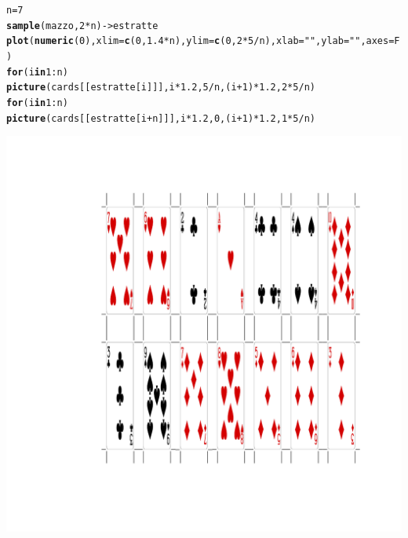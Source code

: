 \documentclass[onecolumn,12pt]{book}\usepackage[]{graphicx}\usepackage[]{color}
\makeatletter
\def\maxwidth{ %
  \ifdim\Gin@nat@width>\linewidth
    \linewidth
  \else
    \Gin@nat@width
  \fi
}
\newcommand{\hlnum}[1]{\textcolor[rgb]{0.686,0.059,0.569}{#1}}%
\newcommand{\hlstr}[1]{\textcolor[rgb]{0.192,0.494,0.8}{#1}}%
\newcommand{\hlopt}[1]{\textcolor[rgb]{0,0,0}{#1}}%
\newcommand{\hlstd}[1]{\textcolor[rgb]{0.345,0.345,0.345}{#1}}%
\newcommand{\hlkwa}[1]{\textcolor[rgb]{0.161,0.373,0.58}{\textbf{#1}}}%
\newcommand{\hlkwb}[1]{\textcolor[rgb]{0.69,0.353,0.396}{#1}}%
\newcommand{\hlkwc}[1]{\textcolor[rgb]{0.333,0.667,0.333}{#1}}%
\newcommand{\hlkwd}[1]{\textcolor[rgb]{0.737,0.353,0.396}{\textbf{#1}}}%
\newenvironment{kframe}{%
 \def\at@end@of@kframe{}%
 \ifinner\ifhmode%
  \def\at@end@of@kframe{\end{minipage}}%
  \begin{minipage}{\columnwidth}%
 \fi\fi%
 \def\FrameCommand##1{\hskip\@totalleftmargin \hskip-\fboxsep
 \colorbox{shadecolor}{##1}\hskip-\fboxsep
     \hskip-\linewidth \hskip-\@totalleftmargin \hskip\columnwidth}%
 \MakeFramed {\advance\hsize-\width
   \@totalleftmargin\z@ \linewidth\hsize
   \@setminipage}}%
 {\par\unskip\endMakeFramed%
 \at@end@of@kframe}
\newenvironment{knitrout}{}{} %
\makeatother
\begin{document}
\begin{knitrout}
\color{fgcolor}\begin{kframe}
\begin{alltt}
\hlstd{n}\hlkwb{=}\hlnum{7}
\hlkwd{sample}\hlstd{(mazzo,}\hlnum{2}\hlopt{*}\hlstd{n)}\hlkwb{->}\hlstd{estratte}
\hlkwd{plot}\hlstd{(}\hlkwd{numeric}\hlstd{(}\hlnum{0}\hlstd{),}\hlkwc{xlim}\hlstd{=}\hlkwd{c}\hlstd{(}\hlnum{0}\hlstd{,}\hlnum{1.4}\hlopt{*}\hlstd{n),}\hlkwc{ylim}\hlstd{=}\hlkwd{c}\hlstd{(}\hlnum{0}\hlstd{,}\hlnum{2}\hlopt{*}\hlnum{5}\hlopt{/}\hlstd{n),}\hlkwc{xlab}\hlstd{=}\hlstr{""}\hlstd{,}\hlkwc{ylab}\hlstd{=}\hlstr{""}\hlstd{,}\hlkwc{axes}\hlstd{=F)}
\hlkwa{for} \hlstd{(i} \hlkwa{in} \hlnum{1}\hlopt{:}\hlstd{n)}
\hlkwd{picture}\hlstd{(cards[[estratte[i]]],i}\hlopt{*}\hlnum{1.2}\hlstd{,}\hlnum{5}\hlopt{/}\hlstd{n,(i}\hlopt{+}\hlnum{1}\hlstd{)}\hlopt{*}\hlnum{1.2}\hlstd{,}\hlnum{2}\hlopt{*}\hlnum{5}\hlopt{/}\hlstd{n)}
\hlkwa{for} \hlstd{(i} \hlkwa{in} \hlnum{1}\hlopt{:}\hlstd{n)}
\hlkwd{picture}\hlstd{(cards[[estratte[i}\hlopt{+}\hlstd{n]]],i}\hlopt{*}\hlnum{1.2}\hlstd{,}\hlnum{0}\hlstd{,(i}\hlopt{+}\hlnum{1}\hlstd{)}\hlopt{*}\hlnum{1.2}\hlstd{,}\hlnum{1}\hlopt{*}\hlnum{5}\hlopt{/}\hlstd{n)}
\end{alltt}
\end{kframe}
\includegraphics[width=\maxwidth]{figure/unnamed-chunk-10-1} 

\end{knitrout}
\end{document}
